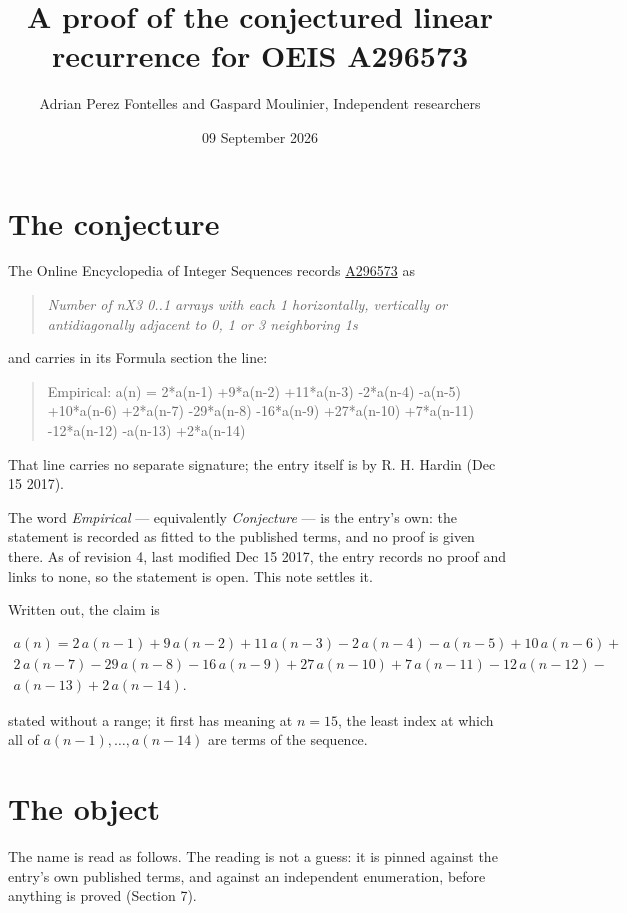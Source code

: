 \documentclass[11pt]{article}
\title{A proof of the conjectured linear recurrence for OEIS A296573}
\author{Adrian Perez Fontelles and Gaspard Moulinier, Independent researchers}
\date{09 September 2026}
\theoremstyle{definition}
\begin{document}
\maketitle
\section{The conjecture}

The Online Encyclopedia of Integer Sequences records \href{https://oeis.org/A296573}{A296573} as

\begin{quote}\itshape Number of nX3 0..1 arrays with each 1 horizontally, vertically or antidiagonally adjacent to 0, 1 or 3 neighboring 1s\end{quote}

and carries in its Formula section the line:

\begin{quote}\ttfamily Empirical: a(n) = 2*a(n-1) +9*a(n-2) +11*a(n-3) -2*a(n-4) -a(n-5) +10*a(n-6) +2*a(n-7) -29*a(n-8) -16*a(n-9) +27*a(n-10) +7*a(n-11) -12*a(n-12) -a(n-13) +2*a(n-14)\end{quote}

That line carries no separate signature; the entry itself is by R. H. Hardin (Dec 15 2017).

The word {\itshape Empirical} --- equivalently {\itshape Conjecture} --- is the entry's own: the statement is recorded as fitted to the published terms, and no proof is given there. As of revision 4, last modified Dec 15 2017, the entry records no proof and links to none, so the statement is open. This note settles it.

Written out, the claim is

\begin{multline*} a(n) = 2\,a(n-1) + 9\,a(n-2) + 11\,a(n-3) - 2\,a(n-4) - a(n-5) + 10\,a(n-6) + \\ 2\,a(n-7) - 29\,a(n-8) - 16\,a(n-9) + 27\,a(n-10) + 7\,a(n-11) - 12\,a(n-12) - \\ a(n-13) + 2\,a(n-14). \end{multline*}

stated without a range; it first has meaning at $n = 15$, the least index at which all of $a(n-1),\dots,a(n-14)$ are terms of the sequence.

\section{The object}

The name is read as follows. The reading is not a guess: it is pinned against the entry's own published terms, and against an independent enumeration, before anything is proved (Section 7).
\end{document}
